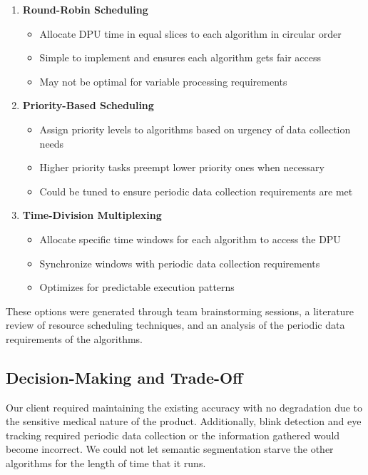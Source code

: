 \begin{enumerate}
\item \textbf{Round-Robin Scheduling}
   \begin{itemize}
   \item Allocate DPU time in equal slices to each algorithm in circular order
   \item Simple to implement and ensures each algorithm gets fair access
   \item May not be optimal for variable processing requirements
   \end{itemize}

\item \textbf{Priority-Based Scheduling}
   \begin{itemize}
   \item Assign priority levels to algorithms based on urgency of data collection needs
   \item Higher priority tasks preempt lower priority ones when necessary
   \item Could be tuned to ensure periodic data collection requirements are met
   \end{itemize}

\item \textbf{Time-Division Multiplexing}
   \begin{itemize}
   \item Allocate specific time windows for each algorithm to access the DPU
   \item Synchronize windows with periodic data collection requirements
   \item Optimizes for predictable execution patterns
   \end{itemize}
\end{enumerate}

These options were generated through team brainstorming sessions, a literature review of resource scheduling techniques, and an analysis of the periodic data requirements of the algorithms.

\subsection{Decision-Making and Trade-Off}\label{subsec:decision-making}

Our client required maintaining the existing accuracy with no degradation due to the sensitive medical nature of the product. Additionally, blink detection and eye tracking required periodic data collection or the information gathered would become incorrect. We could not let semantic segmentation starve the other algorithms for the length of time that it runs.

